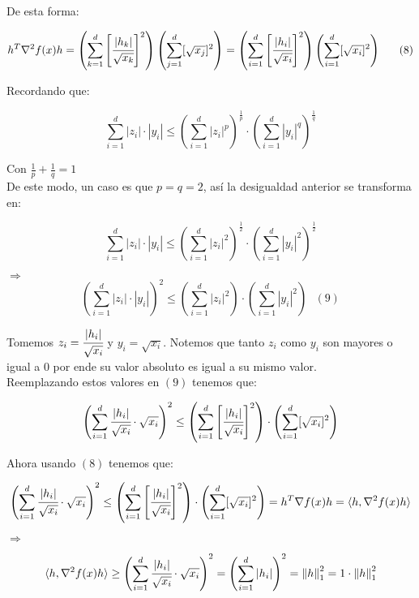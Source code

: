 \documentclass[11pt]{article}
\begin{document}
De esta forma:

\[ h^T \nabla^2 f(x) h = \left( \sum_{k=1}^{d}  \left[ \cfrac{|h_k|}{\sqrt{x_k}} \right]^2 \right) \left( \sum_{j=1}^{d} [\sqrt{x_j}]^2  \right) = \left( \sum_{i=1}^{d}  \left[ \cfrac{|h_i|}{\sqrt{x_i}} \right]^2 \right) \left( \sum_{i=1}^{d} [\sqrt{x_i}]^2  \right) \ \ \ \ \ (8) \]

Recordando que:

\[ \sum_{i=1}^{d} |z_i| \cdot |y_i| \leq \left( \sum_{i=1}^d |z_i|^p \right)^{\frac{1}{p}} \cdot \left( \sum_{i=1}^d |y_i|^q \right)^{\frac{1}{q}}  \] 

Con $ \frac{1}{p} + \frac{1}{q} = 1 $ \\

De este modo, un caso es que $ p = q = 2 $, así la desigualdad anterior se transforma en:

\[ \sum_{i=1}^{d} |z_i| \cdot |y_i| \leq \left( \sum_{i=1}^d |z_i|^2 \right)^{\frac{1}{2}} \cdot \left( \sum_{i=1}^d |y_i|^2 \right)^{\frac{1}{2}}  \] 

$ \Rightarrow $ \\

\[ \left( \sum_{i=1}^{d} |z_i| \cdot |y_i| \right)^2 \leq \left( \sum_{i=1}^d |z_i|^2 \right) \cdot \left( \sum_{i=1}^d |y_i|^2 \right)  \ \ \ (9) \]

Tomemos $ z_i = \cfrac{|h_i|}{\sqrt{x_i}} $ y $ y_i = \sqrt{x_i} $. Notemos que tanto $ z_i $ como $ y_i $ son mayores o igual a $ 0 $ por ende su valor absoluto es igual a su mismo valor. \\

Reemplazando estos valores en $ (9) $ tenemos que:

\[ \left( \sum_{i=1}^{d} \cfrac{|h_i|}{\sqrt{x_i}} \cdot \sqrt{x_i} \right)^2 \leq \left( \sum_{i=1}^d \left[ \cfrac{|h_i|}{\sqrt{x_i}} \right]^2 \right) \cdot \left( \sum_{i=1}^d [\sqrt{x_i}]^2 \right)  \]

Ahora usando $ (8) $ tenemos que:

\[ \left( \sum_{i=1}^{d} \cfrac{|h_i|}{\sqrt{x_i}} \cdot \sqrt{x_i} \right)^2 \leq \left( \sum_{i=1}^d \left[ \cfrac{|h_i|}{\sqrt{x_i}} \right]^2 \right) \cdot \left( \sum_{i=1}^d [\sqrt{x_i}]^2 \right) = h^T \nabla f(x) h = \langle h, \nabla^2 f(x) h \rangle  \]

$ \Rightarrow $

\[ \langle h, \nabla^2 f(x) h \rangle \geq \left( \sum_{i=1}^{d} \cfrac{|h_i|}{\sqrt{x_i}} \cdot \sqrt{x_i} \right)^2 = \left( \sum_{i=1}^{d} |h_i| \right)^2 = \left\| h \right\|_1^2 = 1 \cdot \left\| h \right\|_1^2  \]
\end{document}
